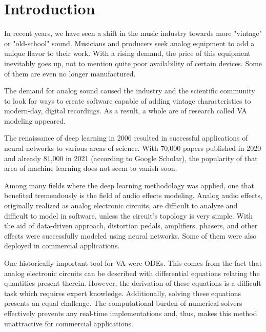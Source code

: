 \chapter{Introduction}
\label{chap:Introduction}

In recent years, we have seen a shift in the music industry towards more "vintage" or "old-school" sound. Musicians and producers seek analog equipment to add a unique flavor to their work. With a rising demand, the price of this equipment inevitably goes up, not to mention quite poor availability of certain devices. Some of them are even no longer manufactured.

The demand for analog sound caused the industry and the scientific community to look for ways to create software capable of adding vintage characteristics to modern-day, digital recordings. As a result, a whole are of research called \acf{VA} modeling appeared.

The renaissance of deep learning in 2006 resulted in successful applications of neural networks to various areas of science. With 70,000 papers published in 2020 and already 81,000 in 2021 (according to Google Scholar), the popularity of that area of machine learning does not seem to vanish soon.

Among many fields where the deep learning methodology was applied, one that benefited tremendously is the field of audio effects modeling. Analog audio effects, originally realized as analog electronic circuits, are difficult to analyze and difficult to model in software, unless the circuit's topology is very simple. With the aid of data-driven approach, distortion pedals, amplifiers, phasers, and other effects were successfully modeled using neural networks. Some of them were also deployed in commercial applications.

One historically important tool for \ac{VA} were \acfp{ODE}. This comes from the fact that analog electronic circuits can be described with differential equations relating the quantities present therein. However, the derivation of these equations is a difficult task which requires expert knowledge. Additionally, solving these equations presents an equal challenge. The computational burden of numerical solvers effectively prevents any real-time implementations and, thus, makes this method unattractive for commercial applications.

